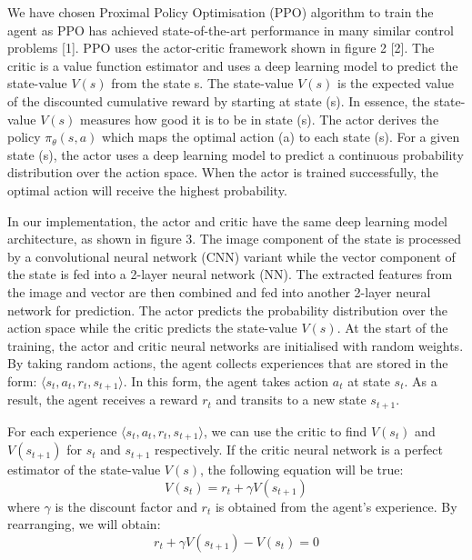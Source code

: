 \documentclass{article}
\begin{document}
We have chosen Proximal Policy Optimisation (PPO) algorithm to train the agent as PPO has achieved state-of-the-art performance in many similar control problems [1]. PPO uses the actor-critic framework shown in figure 2 [2]. The critic is a value function estimator and uses a deep learning model to predict the state-value $V(s)$ from the state s. The state-value $V(s)$ is the expected value of the discounted cumulative reward by starting at state (s). In essence, the state-value $V(s)$ measures how good it is to be in state (s). The actor derives the policy $\pi_\theta(s,a)$ which maps the optimal action (a) to each state (s). For a given state (s), the actor uses a deep learning model to predict a continuous probability distribution over the action space. When the actor is trained successfully, the optimal action will receive the highest probability.

In our implementation, the actor and critic have the same deep learning model architecture, as shown in figure 3. The image component of the state is processed by a convolutional neural network (CNN) variant while the vector component of the state is fed into a 2-layer neural network (NN). The extracted features from the image and vector are then combined and fed into another 2-layer neural network for prediction. The actor predicts the probability distribution over the action space while the critic predicts the state-value \( V(s) \). At the start of the training, the actor and critic neural networks are initialised with random weights. By taking random actions, the agent collects experiences that are stored in the form: \( \langle s_t, a_t, r_t, s_{t+1} \rangle \). In this form, the agent takes action \( a_t \) at state \( s_t \). As a result, the agent receives a reward \( r_t \) and transits to a new state \( s_{t+1} \).

For each experience \( \langle s_t, a_t, r_t, s_{t+1} \rangle \), we can use the critic to find \( V(s_t) \) and \( V(s_{t+1}) \) for \( s_t \) and \( s_{t+1} \) respectively. If the critic neural network is a perfect estimator of the state-value \( V(s) \), the following equation will be true:
\begin{equation}
V(s_t) = r_t + \gamma V(s_{t+1})
\end{equation}
where \( \gamma \) is the discount factor and \( r_t \) is obtained from the agent’s experience. By rearranging, we will obtain:
\begin{equation}
r_t + \gamma V(s_{t+1}) - V(s_t) = 0
\end{equation}
\end{document}
